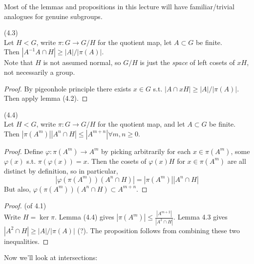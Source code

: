 \documentclass[a4paper]{article}
\begin{document}
\begin{rem}
Most of the lemmas and propositions in this lecture will have familiar/trivial analogues for genuine subgroups.
\end{rem}

\begin{lemma} (4.3)\\
Let $H < G$, write $\pi:G \to G/H$ for the quotient map, let $A \subset G$ be finite.\\
Then $|A^{-1}A \cap H| \geq |A|/|\pi(A)|$.\\
Note that $H$ is not assumed normal, so $G/H$ is just the \emph{space} of left cosets of $xH$, not necessarily a group.
\begin{proof}
By pigeonhole principle there exists $x \in G$ s.t. $|A \cap xH| \geq |A|/|\pi(A)|$. Then apply lemma (4.2).
\end{proof}
\end{lemma}

\begin{lemma} (4.4)\\
Let $H < G$, write $\pi:G \to G/H$ for the quotient map, and let $A \subset G$ be finite.\\
Then $|\pi(A^m)||A^n \cap H| \leq |A^{m+n}| \forall m,n \geq 0$.
\begin{proof}
Define $\varphi:\pi(A^m) \to A^m$ by picking arbitrarily for each $x \in \pi(A^m)$, some $\varphi(x)$ s.t. $\pi(\varphi(x)) = x$. Then the cosets of $\varphi(x) H$ for $x \in \pi(A^m)$ are all distinct by definition, so in particular,
\[
|\varphi(\pi(A^m)) (A^n \cap H)| = |\pi(A^m)| |A^n \cap H|
\]
But also, $\varphi(\pi(A^m)) (A^n \cap H) \subset A^{m+n}$.
\end{proof}
\end{lemma}

\begin{proof} (of 4.1)\\
Write $H=\ker \pi$. Lemma (4.4) gives $|\pi(A^m)| \leq \frac{|A^{m+2}|}{|A^2 \cap H|}$. Lemma 4.3 gives $|A^2 \cap H| \geq |A| / |\pi(A)|$ (?). The proposition follows from combining these two inequalities.
\end{proof}

Now we'll look at intersections:
\end{document}
